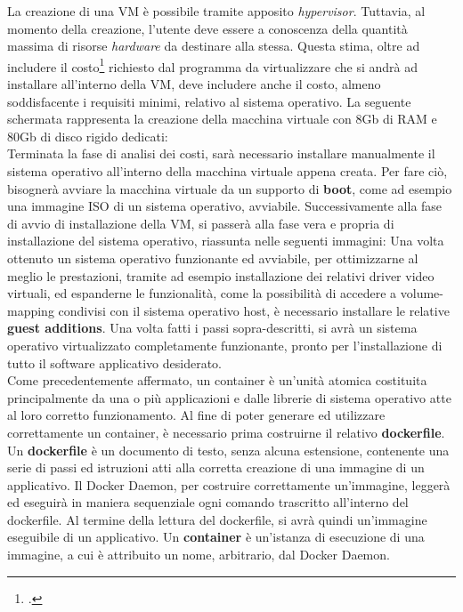 La creazione di una VM è possibile tramite apposito \textit{hypervisor}. Tuttavia, al momento della creazione, l'utente deve essere a conoscenza della quantità massima di risorse \textit{hardware} da destinare alla stessa. Questa stima, oltre ad includere il costo\footcite{inteso come quantitativo di risorse fisiche da allocare} richiesto dal programma da virtualizzare che si andrà ad installare all'interno della VM, deve includere anche il costo, almeno soddisfacente i requisiti minimi, relativo al sistema operativo. 
La seguente schermata rappresenta la creazione della macchina virtuale con 8Gb di RAM e 80Gb di disco rigido dedicati:\\
Terminata la fase di analisi dei costi, sarà necessario installare manualmente il sistema operativo all'interno della macchina virtuale appena creata. Per fare ciò, bisognerà avviare la macchina virtuale da un supporto di \textbf{boot}, come ad esempio una immagine \gls{ISO} di un sistema operativo, avviabile.
Successivamente alla fase di avvio di installazione della VM, si passerà alla fase vera e propria di installazione del sistema operativo, riassunta nelle seguenti immagini:
Una volta ottenuto un sistema operativo funzionante ed avviabile, per ottimizzarne al meglio le prestazioni, tramite ad esempio installazione dei relativi \gls{driver} video virtuali, ed espanderne le funzionalità, come la possibilità di accedere a volume-mapping condivisi con il sistema operativo host, è necessario installare le relative \textbf{\gls{guest additions}}.
Una volta fatti i passi sopra-descritti, si avrà un sistema operativo virtualizzato completamente funzionante, pronto per l'installazione di tutto il software applicativo desiderato.
\\
Come precedentemente affermato, un container è un'unità atomica costituita principalmente da una o più applicazioni e dalle librerie di sistema operativo atte al loro corretto funzionamento.
Al fine di poter generare ed utilizzare correttamente un container, è necessario prima costruirne il relativo \textbf{\gls{dockerfile}}.
Un \textbf{dockerfile} è un documento di testo, senza alcuna estensione, contenente una serie di passi ed istruzioni atti alla corretta creazione di una immagine di un applicativo. Il Docker Daemon, per costruire correttamente un'immagine, leggerà ed eseguirà in maniera sequenziale ogni comando trascritto all'interno del dockerfile. Al termine della lettura del dockerfile, si avrà quindi un'immagine eseguibile di un applicativo. Un \textbf{container} è un'istanza di esecuzione di una immagine, a cui è attribuito un nome, arbitrario, dal Docker Daemon.
